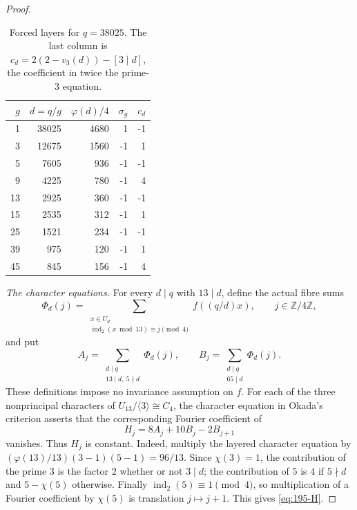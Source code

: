 \documentclass[11pt]{amsart}
\theoremstyle{definition}
\theoremstyle{remark}
\numberwithin{equation}{section}
\begin{document}
\begin{proof}
\begin{table}[ht]
\centering
\caption{Forced layers for $q=38025$.  The last column is
$c_d=2(2-v_3(d))-[3\mid d]$, the coefficient in twice the prime-$3$ equation.}
\label{tab:195-forced}
\begin{tabular}{rrrrr}
\toprule
$g$ & $d=q/g$ & $\varphi(d)/4$ & $\sigma_g$ & $c_d$\\
\midrule
1  & 38025 & 4680 &  1 & -1\\
3  & 12675 & 1560 & -1 &  1\\
5  &  7605 &  936 & -1 & -1\\
9  &  4225 &  780 & -1 &  4\\
13 &  2925 &  360 & -1 & -1\\
15 &  2535 &  312 & -1 &  1\\
25 &  1521 &  234 & -1 & -1\\
39 &   975 &  120 & -1 &  1\\
45 &   845 &  156 & -1 &  4\\
\bottomrule
\end{tabular}
\end{table}

\smallskip\noindent
\emph{The character equations.}
For every $d\mid q$ with $13\mid d$, define the actual fibre sums
\[
 \Phi_d(j)=
 \sum_{\substack{x\in U_d\\\operatorname{ind}_2(x\bmod13)\equiv j\pmod4}}
 f((q/d)x),\qquad j\in\mathbb Z/4\mathbb Z,
\]
and put
\[
 A_j=\sum_{\substack{d\mid q\\13\mid d,\ 5\nmid d}}\Phi_d(j),\qquad
 B_j=\sum_{\substack{d\mid q\\65\mid d}}\Phi_d(j).
\]
These definitions impose no invariance assumption on $f$.
For each of the three nonprincipal characters of
$U_{13}/\langle3\rangle\cong C_4$, the character equation in Okada's criterion
asserts that the corresponding Fourier coefficient of
\begin{equation}\label{eq:195-H}
 H_j=8A_j+10B_j-2B_{j+1}
\end{equation}
vanishes.  Thus $H_j$ is constant.
Indeed, multiply the layered character equation by
$(\varphi(13)/13)(3-1)(5-1)=96/13$.
Since $\chi(3)=1$, the contribution of the prime $3$ is the factor $2$
whether or not $3\mid d$; the contribution of $5$ is $4$ if $5\nmid d$ and
$5-\chi(5)$ otherwise.
Finally $\operatorname{ind}_2(5)\equiv1\pmod4$, so multiplication of a Fourier
coefficient by $\chi(5)$ is translation $j\mapsto j+1$.
This gives \eqref{eq:195-H}.


\end{proof}
\end{document}
